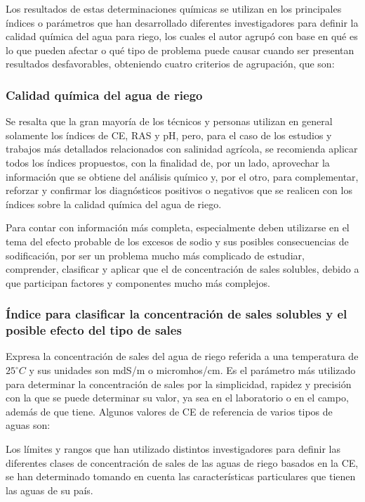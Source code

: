 Los resultados de estas determinaciones químicas se utilizan en los principales índices o parámetros que han desarrollado diferentes investigadores para definir la calidad química del agua para riego, los cuales el autor agrupó con base en qué es lo que pueden afectar o qué tipo de problema puede causar cuando ser presentan resultados desfavorables, obteniendo cuatro criterios de agrupación, que son:
\subsubsection{Calidad química del agua de riego}
Se resalta que la gran mayoría de los técnicos y personas utilizan en general solamente los índices de CE, RAS y pH, pero, para el caso de los estudios y trabajos más detallados relacionados con salinidad agrícola, se recomienda aplicar todos los índices propuestos, con la finalidad de, por un lado, aprovechar la información que se obtiene del análisis químico y, por el otro, para complementar, reforzar y confirmar los diagnósticos positivos o negativos que se realicen con los índices sobre la calidad química del agua de riego.

Para contar con información más completa, especialmente deben utilizarse en el tema del efecto probable de los excesos de sodio y sus posibles consecuencias de sodificación, por ser un problema mucho más complicado de estudiar, comprender, clasificar y aplicar que el de concentración de sales solubles, debido a que participan factores y componentes mucho más complejos.
\subsubsection{Índice para clasificar la concentración de sales solubles y el posible efecto del tipo de sales}
Expresa la concentración de sales del agua de riego referida a una temperatura de $25^{\circ} C$ y sus unidades son mdS/m o micromhos/cm. Es el parámetro más utilizado para determinar la concentración de sales por la simplicidad, rapidez y precisión con la que se puede determinar su valor, ya sea en el laboratorio o en el campo, además de que tiene. Algunos valores de CE de referencia de varios tipos de aguas son:

Los límites y rangos que han utilizado distintos investigadores para definir las diferentes clases de concentración de sales de las aguas de riego basados en la CE, se han determinado tomando en cuenta las características particulares que tienen las aguas de su país.


